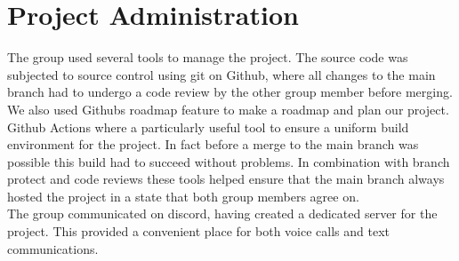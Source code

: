 \section{Project Administration} 

The group used several tools to manage the project. The source code was subjected to
source control using git on Github, where all changes to the main branch had to
undergo a code review by the other group member before merging. We also used Githubs
roadmap feature to make a roadmap and plan our project. \\

Github Actions where a particularly useful tool to ensure a uniform build environment
for the project. In fact before a merge to the main branch was possible this build
had to succeed without problems. 
In combination with branch protect and code reviews these tools helped ensure that the
main branch always hosted the project in a state that both group members agree on. \\

The group communicated on discord, having created a dedicated server
for the project. This provided a convenient place for both voice calls and text
communications.  
